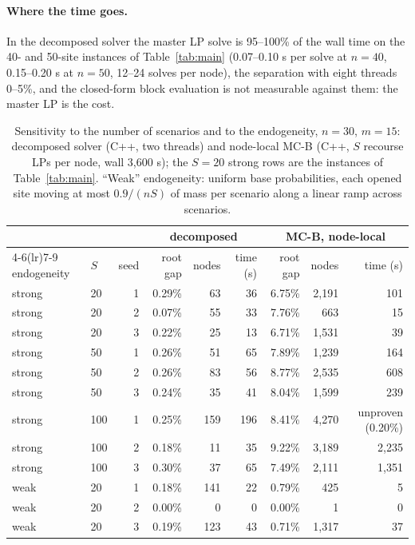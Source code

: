 \documentclass[11pt]{article}
\begin{document}
\paragraph{Where the time goes.} In the decomposed solver the master LP solve is 95--100\% of the wall time on the
40- and 50-site instances of Table~\ref{tab:main} (0.07--0.10 s per solve at $n = 40$, 0.15--0.20 s at $n = 50$,
12--24 solves per node), the separation with eight threads 0--5\%, and the closed-form block evaluation is not
measurable against them: the master LP is the cost.

\begin{table}[ht]
\centering\small
\caption{Sensitivity to the number of scenarios and to the endogeneity, $n = 30$, $m = 15$: decomposed solver (C++,
two threads) and node-local \textsc{MC-B} (C++, $S$ recourse LPs per node, wall 3,600 s); the $S = 20$ strong rows are the instances of
Table~\ref{tab:main}. ``Weak'' endogeneity: uniform base probabilities, each opened site moving at most $0.9/(nS)$
of mass per scenario along a linear ramp across scenarios.}
\label{tab:sens}
\begin{tabular}{llr rrr rrr}
\toprule
& & & \multicolumn{3}{c}{decomposed} & \multicolumn{3}{c}{\textsc{MC-B}, node-local}\\
\cmidrule(lr){4-6}\cmidrule(lr){7-9}
endogeneity & $S$ & seed & root gap & nodes & time (s) & root gap & nodes & time (s)\\
\midrule
strong & 20  & 1 & 0.29\% & 63 & 36 & 6.75\% & 2,191 & 101\\
strong & 20  & 2 & 0.07\% & 55 & 33 & 7.76\% & 663 & 15\\
strong & 20  & 3 & 0.22\% & 25 & 13 & 6.71\% & 1,531 & 39\\
strong & 50  & 1 & 0.26\% & 51 & 65 & 7.89\% & 1,239 & 164\\
strong & 50  & 2 & 0.26\% & 83 & 56 & 8.77\% & 2,535 & 608\\
strong & 50  & 3 & 0.24\% & 35 & 41 & 8.04\% & 1,599 & 239\\
strong & 100 & 1 & 0.25\% & 159 & 196 & 8.41\% & 4,270 & unproven (0.20\%)\\
strong & 100 & 2 & 0.18\% & 11 & 35 & 9.22\% & 3,189 & 2,235\\
strong & 100 & 3 & 0.30\% & 37 & 65 & 7.49\% & 2,111 & 1,351\\
weak   & 20  & 1 & 0.18\% & 141 & 22 & 0.79\% & 425 & 5\\
weak   & 20  & 2 & 0.00\% & 0 & 0 & 0.00\% & 1 & 0\\
weak   & 20  & 3 & 0.19\% & 123 & 43 & 0.71\% & 1,317 & 37\\
\bottomrule
\end{tabular}
\end{table}
\end{document}
